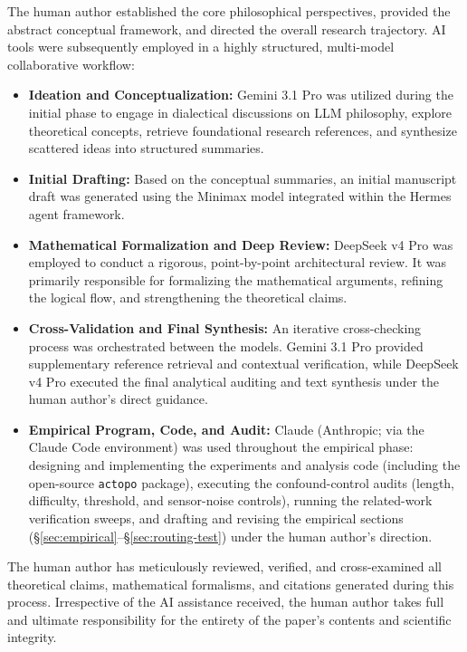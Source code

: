 \documentclass{article}
\begin{document}
The human author established the core philosophical perspectives, provided the abstract conceptual framework, and directed the overall research trajectory. AI tools were subsequently employed in a highly structured, multi-model collaborative workflow:
\begin{itemize}
    \item \textbf{Ideation and Conceptualization:} Gemini 3.1 Pro was utilized during the initial phase to engage in dialectical discussions on LLM philosophy, explore theoretical concepts, retrieve foundational research references, and synthesize scattered ideas into structured summaries.
    \item \textbf{Initial Drafting:} Based on the conceptual summaries, an initial manuscript draft was generated using the Minimax model integrated within the Hermes agent framework.
    \item \textbf{Mathematical Formalization and Deep Review:} DeepSeek v4 Pro was employed to conduct a rigorous, point-by-point architectural review. It was primarily responsible for formalizing the mathematical arguments, refining the logical flow, and strengthening the theoretical claims.
    \item \textbf{Cross-Validation and Final Synthesis:} An iterative cross-checking process was orchestrated between the models. Gemini 3.1 Pro provided supplementary reference retrieval and contextual verification, while DeepSeek v4 Pro executed the final analytical auditing and text synthesis under the human author's direct guidance.
    \item \textbf{Empirical Program, Code, and Audit:} Claude (Anthropic; via the Claude Code environment) was used throughout the empirical phase: designing and implementing the experiments and analysis code (including the open-source \texttt{actopo} package), executing the confound-control audits (length, difficulty, threshold, and sensor-noise controls), running the related-work verification sweeps, and drafting and revising the empirical sections (\S\ref{sec:empirical}--\S\ref{sec:routing-test}) under the human author's direction.
\end{itemize}

The human author has meticulously reviewed, verified, and cross-examined all theoretical claims, mathematical formalisms, and citations generated during this process. Irrespective of the AI assistance received, the human author takes full and ultimate responsibility for the entirety of the paper's contents and scientific integrity.
\end{document}
